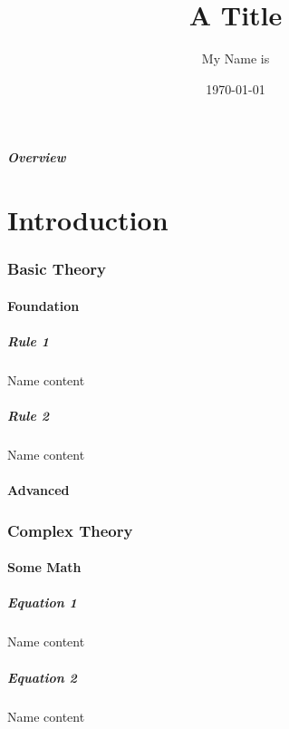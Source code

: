 \documentclass{beamer}[10]
\title{A Title}
\author{My Name is}
\institute{I work at}
\date{\today}
\begin{document}
\frame{\titlepage \vspace{-0.5cm}
}

\frame
{
\frametitle{Overview}
\tableofcontents
}


\part{Introduction}
\section{Basic Theory}
    \subsection{Foundation}
        \subsubsection{Rule 1}
                \begin{frame}{Name}{\subsubsecname}	content \end{frame}
        \subsubsection{Rule 2}
                \begin{frame}{Name}{\subsubsecname}	content \end{frame}
    \subsection{Advanced}
\section{Complex Theory}
    \subsection{Some Math}
        \subsubsection{Equation 1}
                \begin{frame}{Name}{\subsubsecname}	content \end{frame}
        \subsubsection{Equation 2}
                \begin{frame}{Name}{\subsubsecname}	content \end{frame}
\end{document}
